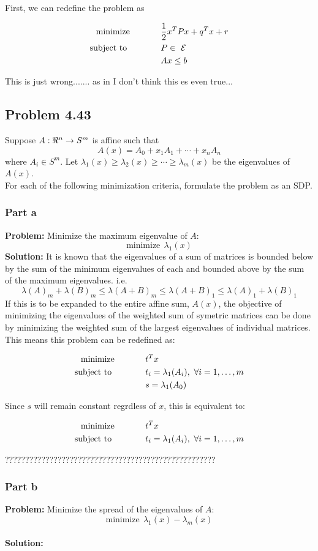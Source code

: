 \documentclass[letter]{article}
\newcommand{\optpblm}[3][eq:default]{
	\begin{equation}\label{#1}
		\begin{aligned}
			\text{minimize} \hspace{0.5in} &#2\vspace{5pt}\\
			\text{subject to \hspace{0.5in}} &#3
		\end{aligned}	
	\end{equation}
}
\begin{document}
First, we can redefine the problem as
\optpblm{\frac{1}{2} x^T P x + q^T x + r}{
	P \in\ \mathcal{E}\\
	&Ax \leq b}

This is just wrong....... as in I don't think this es even true...









\newpage
\subsection{Problem 4.43}
Suppose $A: \real^n \to S^m$ is affine such that
\begin{equation}
	A(x) = A_0 + x_1 A_1 + \cdots + x_n A_n
\end{equation}
where $A_i \in S^m$. Let $\lambda_1(x) \geq \lambda_2(x) \geq \cdots \geq \lambda_m(x)$ be the eigenvalues of $A(x)$.\\


For each of the following minimization criteria, formulate the problem as an SDP.\\

\subsubsection{Part a}
\textbf{Problem:}
Minimize the maximum eigenvalue of $A$: $$\text{minimize} \ \ \lambda_1(x)$$
\textbf{Solution:}
It is known that the eigenvalues of a sum of matrices is bounded below by the sum of the minimum eigenvalues of each and bounded above by the sum of the maximum eigenvalues.
\cite{eigvalueBound}
i.e.
$$ \lambda(A)_m + \lambda(B)_m \leq \lambda(A+B)_m \leq \lambda(A+B)_1 \leq \lambda(A)_1 + \lambda(B)_1$$
If this is to be expanded to the entire affine sum, $A(x)$, the objective of minimizing the eigenvalues of the weighted sum of symetric matrices can be done by minimizing the weighted sum of the largest eigenvalues of individual matrices.
This means this problem can be redefined as:
\optpblm{t^T x}{
	t_i = \lambda_1(A_i), \ \forall i = 1,\dots,m\\
	&s = \lambda_1(A_0)}
Since $s$ will remain constant regrdless of $x$, this is equivalent to:
\optpblm{t^T x}{
	t_i = \lambda_1(A_i), \ \forall i = 1,\dots,m}

????????????????????????????????????????????????????

\newpage
\subsubsection{Part b}
\textbf{Problem:}
Minimize the spread of the eigenvalues of $A$: $$\text{minimize} \ \ \lambda_1(x) - \lambda_m(x)$$\\
\textbf{Solution:}
\end{document}
